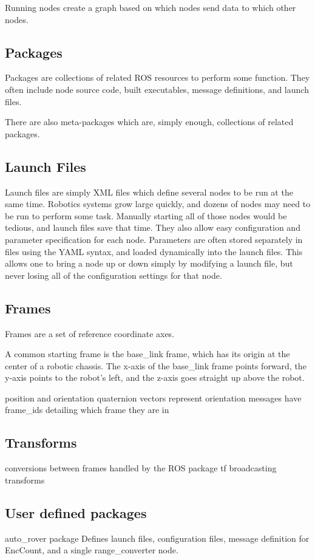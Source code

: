 Running nodes create a graph based on which nodes send data to which other nodes.

\subsection{Packages}
Packages are collections of related ROS resources to perform some function. They often include node source code, built executables, message definitions, and launch files.

There are also meta-packages which are, simply enough, collections of related packages.

\subsection{Launch Files}
Launch files are simply XML files which define several nodes to be run at the same time. Robotics systems grow large quickly, and dozens of nodes may need to be run to perform some task. Manually starting all of those nodes would be tedious, and launch files save that time. They also allow easy configuration and parameter specification for each node. Parameters are often stored separately in files using the YAML syntax, and loaded dynamically into the launch files. This allows one to bring a node up or down simply by modifying a launch file, but never losing all of the configuration settings for that node.

\subsection{Frames}
Frames are a set of reference coordinate axes.

A common starting frame is the base\_link frame, which has its origin at the center of a robotic chassis. The x-axis of the base\_link frame points forward, the y-axis points to the robot's left, and the z-axis goes straight up above the robot.


position and orientation
quaternion vectors represent orientation
messages have frame\_ids detailing which frame they are in

\subsection{Transforms}
conversions between frames
handled by the ROS package tf
broadcasting transforms


\subsection{User defined packages}
auto\_rover package
Defines launch files, configuration files, message definition for EncCount, and a single range\_converter node. 


